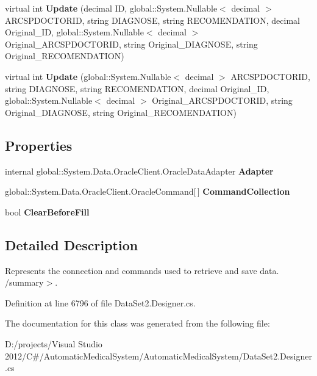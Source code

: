 \begin{CompactItemize}
\item 
virtual int \textbf{Update} (decimal ID, global::System.Nullable$<$ decimal $>$ ARCSPDOCTORID, string DIAGNOSE, string RECOMENDATION, decimal Original\_\-ID, global::System.Nullable$<$ decimal $>$ Original\_\-ARCSPDOCTORID, string Original\_\-DIAGNOSE, string Original\_\-RECOMENDATION)\label{class_automatic_medical_system_1_1_data_set2_table_adapters_1_1_d_i_a_g_n_o_s_e___s_p___d_o_c_t_o_r_table_adapter_0e00c562bb0b86e6a2a368910cc253d6}

\item 
virtual int \textbf{Update} (global::System.Nullable$<$ decimal $>$ ARCSPDOCTORID, string DIAGNOSE, string RECOMENDATION, decimal Original\_\-ID, global::System.Nullable$<$ decimal $>$ Original\_\-ARCSPDOCTORID, string Original\_\-DIAGNOSE, string Original\_\-RECOMENDATION)\label{class_automatic_medical_system_1_1_data_set2_table_adapters_1_1_d_i_a_g_n_o_s_e___s_p___d_o_c_t_o_r_table_adapter_ffdff15d73b5991d316e0a1dbb84b3f8}

\end{CompactItemize}
\subsection*{Properties}
\begin{CompactItemize}
\item 
internal global::System.Data.OracleClient.OracleDataAdapter \textbf{Adapter}\hspace{0.3cm}{\tt  [get]}\label{class_automatic_medical_system_1_1_data_set2_table_adapters_1_1_d_i_a_g_n_o_s_e___s_p___d_o_c_t_o_r_table_adapter_61af14497ec38d030ff78ed67c63e8cc}

\item 
global::System.Data.OracleClient.OracleCommand[$\,$] \textbf{CommandCollection}\hspace{0.3cm}{\tt  [get]}\label{class_automatic_medical_system_1_1_data_set2_table_adapters_1_1_d_i_a_g_n_o_s_e___s_p___d_o_c_t_o_r_table_adapter_aa7ced6f59f1609f17569f5bea64c682}

\item 
bool \textbf{ClearBeforeFill}\hspace{0.3cm}{\tt  [get, set]}\label{class_automatic_medical_system_1_1_data_set2_table_adapters_1_1_d_i_a_g_n_o_s_e___s_p___d_o_c_t_o_r_table_adapter_8edc3f5e320403a11bfb319d75d45ac2}

\end{CompactItemize}


\subsection{Detailed Description}
Represents the connection and commands used to retrieve and save data. /summary$>$. 

Definition at line 6796 of file DataSet2.Designer.cs.

The documentation for this class was generated from the following file:\begin{CompactItemize}
\item 
D:/projects/Visual Studio 2012/C\#/AutomaticMedicalSystem/AutomaticMedicalSystem/DataSet2.Designer.cs\end{CompactItemize}
